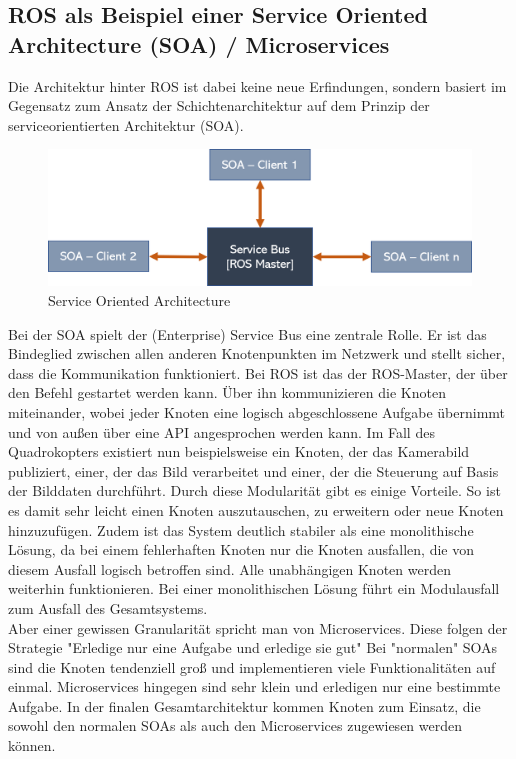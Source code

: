 \subsection{ROS als Beispiel einer Service Oriented Architecture (SOA) / Microservices}
Die Architektur hinter ROS ist dabei keine neue Erfindungen, sondern basiert im Gegensatz zum Ansatz der Schichtenarchitektur auf dem Prinzip der serviceorientierten Architektur (SOA). 
\begin{figure}[h]
	\centering
	\includegraphics[scale=0.5]{"Grafiken/soa.png"}
	\caption{Service Oriented Architecture}
	\label{fig:meine-grafik}
\end{figure}
Bei der SOA spielt der (Enterprise) Service Bus eine zentrale Rolle. Er ist das Bindeglied zwischen allen anderen Knotenpunkten im Netzwerk und stellt sicher, dass die Kommunikation funktioniert. Bei ROS ist das der ROS-Master, der über den Befehl  gestartet werden kann. Über ihn kommunizieren die Knoten miteinander, wobei jeder Knoten eine logisch abgeschlossene Aufgabe übernimmt und von außen über eine API angesprochen werden kann. Im Fall des Quadrokopters existiert nun beispielsweise ein Knoten, der das Kamerabild publiziert, einer, der das Bild verarbeitet und einer, der die Steuerung auf Basis der Bilddaten durchführt. Durch diese Modularität gibt es einige Vorteile. So ist es damit sehr leicht einen Knoten auszutauschen, zu erweitern oder neue Knoten hinzuzufügen. Zudem ist das System deutlich stabiler als eine monolithische Lösung, da bei einem fehlerhaften Knoten nur die Knoten ausfallen, die von diesem Ausfall logisch betroffen sind. Alle unabhängigen Knoten werden weiterhin funktionieren. Bei einer monolithischen Lösung führt ein Modulausfall zum Ausfall des Gesamtsystems. \\

Aber einer gewissen Granularität spricht man von Microservices. Diese folgen der Strategie 
"Erledige nur eine Aufgabe und erledige sie gut" %
Bei "normalen" SOAs sind die Knoten tendenziell groß und implementieren viele Funktionalitäten auf einmal. Microservices hingegen sind sehr klein und erledigen nur eine bestimmte Aufgabe. In der finalen Gesamtarchitektur kommen Knoten zum Einsatz, die sowohl den normalen SOAs als auch den Microservices zugewiesen werden können.



